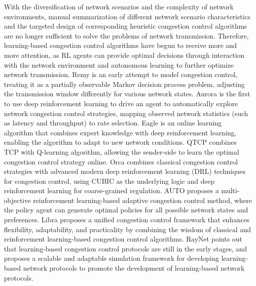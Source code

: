 With the diversification of network scenarios and the complexity of network environments, manual summarization of different network scenario characteristics and the targeted design of corresponding heuristic congestion control algorithms are no longer sufficient to solve the problems of network transmission. Therefore, learning-based congestion control algorithms have begun to receive more and more attention, as RL agents can provide optimal decisions through interaction with the network environment and autonomous learning to further optimize network transmission. Remy\cite{a61:K} is an early attempt to model congestion control, treating it as a partially observable Markov decision process problem, adjusting the transmission window differently for various network states. Aurora\cite{a28:N} is the first to use deep reinforcement learning to drive an agent to automatically explore network congestion control strategies, mapping observed network statistics (such as latency and throughput) to rate selection. Eagle\cite{a62:S} is an online learning algorithm that combines expert knowledge with deep reinforcement learning, enabling the algorithm to adapt to new network conditions. QTCP\cite{a63:W} combines TCP with Q-learning algorithm, allowing the sender-side to learn the optimal congestion control strategy online. Orca\cite{a29:S} combines classical congestion control strategies with advanced modern deep reinforcement learning (DRL) techniques for congestion control, using CUBIC as the underlying logic and deep reinforcement learning for coarse-grained regulation. AUTO\cite{a30:X} proposes a multi-objective reinforcement learning-based adaptive congestion control method, where the policy agent can generate optimal policies for all possible network states and preferences. Libra\cite{a31:Z} proposes a unified congestion control framework that enhances flexibility, adaptability, and practicality by combining the wisdom of classical and reinforcement learning-based congestion control algorithms. RayNet\cite{a32:L} points out that learning-based congestion control protocols are still in the early stages, and proposes a scalable and adaptable simulation framework for developing learning-based network protocols to promote the development of learning-based network protocols. 

